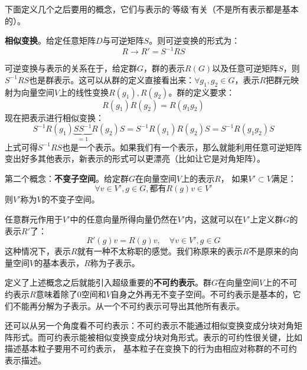 下面定义几个之后要用的概念，它们与表示的‘等级’有关（不是所有表示都是基本的）。


{\bf 相似变换}。给定任意矩阵$D$与可逆矩阵$S$。则可逆变换的形式为：
\begin{equation}
\label{equ3.89}
R \rightarrow R' = S^{-1} RS
\end{equation}

可逆变换与表示的关系在于，给定群$G$，群的表示$R(G)$以及任意可逆矩阵$S$，则$S^{-1} RS$也是群表示。这可以从群的定义直接看出来：$\forall g_1, g_2 \in G$，表示$R$把群元映射为向量空间$V$上的线性变换$R(g_1),R(g_2)$。群的定义要求：
\begin{equation}
\label{equ3.90}
R(g_1) R(g_2) = R(g_1 g_2)
\end{equation}
现在把表示进行相似变换：
\begin{equation}
\label{equ3.91}
S^{-1} R(g_1) \underbrace{SS^{-1}}_{=1} R(g_2) S = S^{-1} R(g_1) R(g_2) S = S^{-1} R(g_1 g_2) S
\end{equation}
上式可得$S^{-1} RS$也是一个表示。如果我们有一个表示，那么就能利用任意可逆矩阵变出好多其他表示，新表示的形式可以更漂亮（比如让它是对角矩阵）。

第二个概念：{\bf 不变子空间}。给定群$G$在向量空间$V$上的表示$R$， 如果$V' \subset V$满足：
\[
\forall v \in V', g \in G, \text{都有} R(g)v \in V'
\]
则$V'$称为$V$的不变子空间。

任意群元作用于$V'$中的任意向量所得向量仍然在$V'$内，这就可以在$V'$上定义群$G$的表示$R'$了：
\begin{equation}
\label{equ3.92}
R'(g) v = R(g) v,\quad \forall v \in V', g \in G
\end{equation}
这种情况下，表示$R$就有一种不太称职的感觉。我们称原来的表示$R$不是原来的向量空间$V$的基本表示，$R$称为子表示。%

定义了上述概念之后就能引入超级重要的{\bf 不可约表示}。群$G$在向量空间$V$上的不可约表示$R$意味着除了$0$空间和$V$自身之外再无不变子空间。不可约表示是基本的，它们不能再分解为子表示。从一个不可约表示可导出其他所有表示。

还可以从另一个角度看不可约表示：不可约表示不能通过相似变换变成分块对角矩阵形式。而可约表示能被相似变换变成分块对角形式。表示的可约性很关键，比如描述基本粒子要用不可约表示，%
基本粒子在变换下的行为由相应对称群的不可约表示描述。

